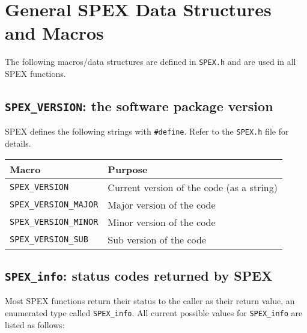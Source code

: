 \documentclass[12pt,oneside]{book}
\theoremstyle{definition}
\newenvironment{SizedCenteredTabular}[2][\small]
    {   
        #1\begin{center}\begin{tabular}{#2}
    }{ 
        \end{tabular}\end{center}
    }
\begin{document}
\chapter{General SPEX Data Structures and Macros}\vspace{-0.75in}

The following macros/data structures are defined in \verb|SPEX.h| and are used in all SPEX functions.


\section{\texttt{SPEX\_VERSION}: the software package version}
SPEX defines the following strings with \verb|#define|. Refer to
the \verb|SPEX.h| file for details.

\begin{SizedCenteredTabular}{ll} \hline
    Macro                    & Purpose                                  \\ \hline
   \verb|SPEX_VERSION|       & Current version of the code (as a string)\\
   \verb|SPEX_VERSION_MAJOR| & Major version of the code                \\
   \verb|SPEX_VERSION_MINOR| & Minor version of the code                \\
   \verb|SPEX_VERSION_SUB|   & Sub version of the code                  \\ \hline
\end{SizedCenteredTabular}


\section{\texttt{SPEX\_info}: status codes returned by SPEX} \label{ss:SPEX_info}
Most SPEX functions return their status to the caller as their return value,
an enumerated type called \verb|SPEX_info|. All current possible values for
\verb|SPEX_info| are listed as follows:
\end{document}
